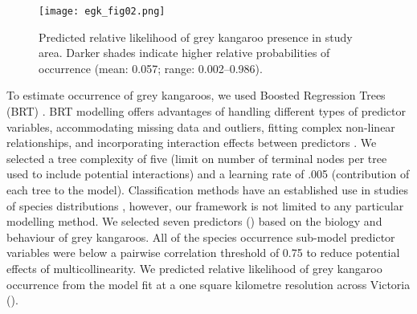 \begin{figure*}[htp]
  \centering
  \texttt{[image: egk\_fig02.png]}
  \caption[Predicted relative likelihood of grey kangaroo occurrence in Victoria]{Predicted relative likelihood of grey kangaroo presence in study area. Darker shades indicate higher relative probabilities of occurrence (mean: 0.057; range: 0.002--0.986).}
  \label{egk_occmap}
\end{figure*}

To estimate occurrence of grey kangaroos, we used Boosted Regression Trees (BRT) \citep{frie02}. BRT modelling offers advantages of handling different types of predictor variables, accommodating missing data and outliers, fitting complex non-linear relationships, and incorporating interaction effects between predictors \citep{elit08}. We selected a tree complexity of five (limit on number of terminal nodes per tree used to include potential interactions) and a learning rate of .005 (contribution of each tree to the model). Classification methods have an established use in studies of species distributions \citep{walk90,skid96}, however, our framework is not limited to any particular modelling method. We selected seven predictors () based on the biology and behaviour of grey kangaroos. All of the species occurrence sub-model predictor variables were below a pairwise correlation threshold of 0.75 to reduce potential effects of multicollinearity. We predicted relative likelihood of grey kangaroo occurrence from the model fit at a one square kilometre resolution across Victoria ().

